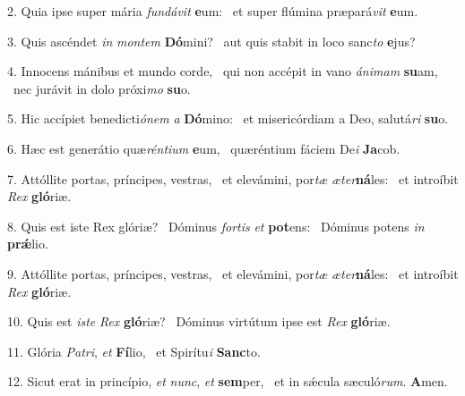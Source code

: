 2. Quia ipse super mária \textit{fun}\textit{dá}\textit{vit} \textbf{e}um: \ast\  et super flúmina præpará\textit{vit} \textbf{e}um.\

3. Quis ascéndet \textit{in} \textit{mon}\textit{tem} \textbf{Dó}mini? \ast\  aut quis stabit in loco sanc\textit{to} \textbf{e}jus?\

4. Innocens mánibus et mundo corde, \dag\  qui non accépit in vano \textit{á}\textit{ni}\textit{mam} \textbf{su}am, \ast\  nec jurávit in dolo próxi\textit{mo} \textbf{su}o.\

5. Hic accípiet benedicti\textit{ó}\textit{nem} \textit{a} \textbf{Dó}mino: \ast\  et misericórdiam a Deo, salutá\textit{ri} \textbf{su}o.\

6. Hæc est generátio quæ\textit{rén}\textit{ti}\textit{um} \textbf{e}um, \ast\  quæréntium fáciem De\textit{i} \textbf{Ja}cob.\

7. Attóllite portas, príncipes, vestras, \dag\  et elevámini, por\textit{tæ} \textit{æ}\textit{ter}\textbf{ná}les: \ast\  et introíbit \textit{Rex} \textbf{gló}riæ.\

8. Quis est iste Rex glóriæ? \dag\  Dóminus \textit{for}\textit{tis} \textit{et} \textbf{pot}ens: \ast\  Dóminus potens \textit{in} \textbf{prǽ}lio.\

9. Attóllite portas, príncipes, vestras, \dag\  et elevámini, por\textit{tæ} \textit{æ}\textit{ter}\textbf{ná}les: \ast\  et introíbit \textit{Rex} \textbf{gló}riæ.\

10. Quis est \textit{is}\textit{te} \textit{Rex} \textbf{gló}riæ? \ast\  Dóminus virtútum ipse est \textit{Rex} \textbf{gló}riæ.\

11. Glória \textit{Pa}\textit{tri}, \textit{et} \textbf{Fí}lio, \ast\  et Spirítu\textit{i} \textbf{Sanc}to.\

12. Sicut erat in princípio, \textit{et} \textit{nunc}, \textit{et} \textbf{sem}per, \ast\  et in sǽcula sæculó\textit{rum}. \textbf{A}men.\

